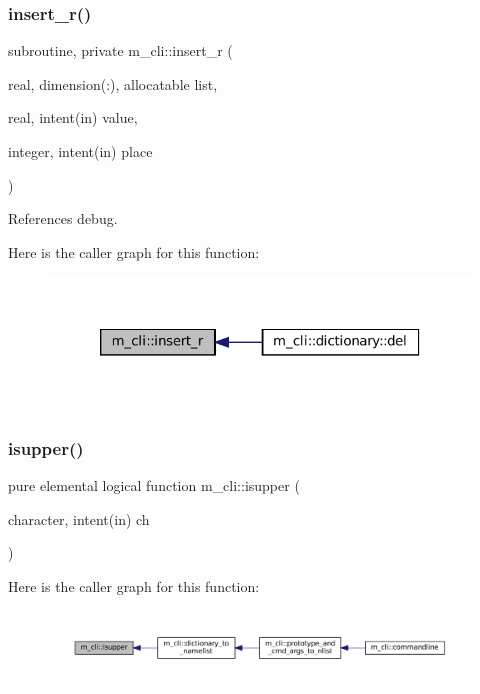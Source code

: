 \subsubsection{\texorpdfstring{insert\+\_\+r()}{insert\_r()}}
{\footnotesize\ttfamily subroutine, private m\+\_\+cli\+::insert\+\_\+r (\begin{DoxyParamCaption}\item[{real, dimension(\+:), allocatable}]{list,  }\item[{real, intent(in)}]{value,  }\item[{integer, intent(in)}]{place }\end{DoxyParamCaption})\hspace{0.3cm}{\ttfamily [private]}}



References debug.

Here is the caller graph for this function\+:
\nopagebreak
\begin{figure}[H]
\begin{center}
\leavevmode
\includegraphics[width=320pt]{namespacem__cli_a4bfb90e14824f94017b1d4fcb39f0701_icgraph}
\end{center}
\end{figure}
\mbox{\label{namespacem__cli_a4c126288dc18289b2095a0882f10ca77}} 
\subsubsection{\texorpdfstring{isupper()}{isupper()}}
{\footnotesize\ttfamily pure elemental logical function m\+\_\+cli\+::isupper (\begin{DoxyParamCaption}\item[{character, intent(in)}]{ch }\end{DoxyParamCaption})\hspace{0.3cm}{\ttfamily [private]}}

Here is the caller graph for this function\+:
\nopagebreak
\begin{figure}[H]
\begin{center}
\leavevmode
\includegraphics[width=350pt]{namespacem__cli_a4c126288dc18289b2095a0882f10ca77_icgraph}
\end{center}
\end{figure}
\mbox{\label{namespacem__cli_ade3d1e36f0fc6a47b5469dcd8ade5312}} 
